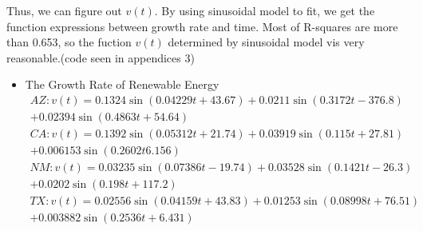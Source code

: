 Thus, we can figure out $ v(t) $. By using sinusoidal model to fit, we get the function expressions between growth rate and time. Most of R-squares are more than 0.653, so the fuction $  v(t) $ determined by sinusoidal model vis very reasonable.(code seen in appendices 3)
\begin{itemize}
	\item The Growth Rate of Renewable Energy\\
	\setlength\multlinegap{0em}
	\setlength\multlinetaggap{6em}
	\begin{multline}
	AZ:v(t)=0.1324\sin(0.04229t+43.67)+0.0211\sin(0.3172t-376.8)\\+0.02394\sin(0.4863t+54.64)%
	\end{multline}
	\begin{multline}
	CA:v(t)=0.1392\sin(0.05312t+21.74)+0.03919\sin(0.115t+27.81)\\+0.006153\sin(0.2602t6.156)%
	\end{multline}
	\begin{multline}
	NM:v(t)=0.03235\sin(0.07386t-19.74)+0.03528\sin(0.1421t-26.3)\\+0.0202\sin(0.198t+117.2)%
	\end{multline}
	\begin{multline}
	TX:v(t)=0.02556\sin(0.04159t+43.83)+0.01253\sin(0.08998t+76.51)\\+0.003882\sin(0.2536t+6.431)%
	\end{multline}
	\begin{figure}[htbp]
		\centering                                             %
\end{figure}
\end{itemize}
